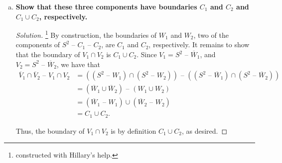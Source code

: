 \documentclass[11pt]{article}
\newenvironment{solution}
  {\renewcommand\qedsymbol{$\blacksquare$}\begin{proof}[Solution]}
  {\end{proof}}
\begin{document}
\begin{enumerate}[a)]
    \item \textbf{Show that these three components have boundaries $C_1$ and $C_2$ and $C_1 \cup C_2$, respectively.}
    
    \begin{solution}\footnote{constructed with Hillary's help.}
    By construction, the boundaries of $W_1$ and $W_2$, two of the components of $S^2 \text{ -- } C_1 \text{ -- } C_2$, are $C_1$ and $C_2$, respectively. 
    It remains to show that the boundary of $V_1 \cap V_2$ is $C_1 \cup C_2$. Since $V_1 = S^2 \text{ -- } \overline{W}_1$, and $V_2 = S^2 \text{ -- } \overline{W}_2$, we have that
    \begin{align*}
        \overline{V}_1 \cap \overline{V}_2 \text{ -- } V_1 \cap V_2 &= ((S^2 \text{ -- } W_1) \cap (S^2 \text{ -- } W_2)) \text{ -- } ((S^2 \text{ -- } \overline{W}_1) \cap (S^2 \text{ -- } \overline{W}_2)) \\
        &= (\overline{W}_1 \cup \overline{W}_2) \text{ -- } (W_1 \cup W_2) \\
        &= (\overline{W}_1 \text{ -- } W_1) \cup (\overline{W}_2 \text{ -- } W_2) \\
        &= C_1 \cup C_2.
    \end{align*}

    Thus, the boundary of $V_1 \cap V_2$ is by definition $C_1 \cup C_2$, as desired.
    \end{solution}
\end{enumerate}
\end{document}
